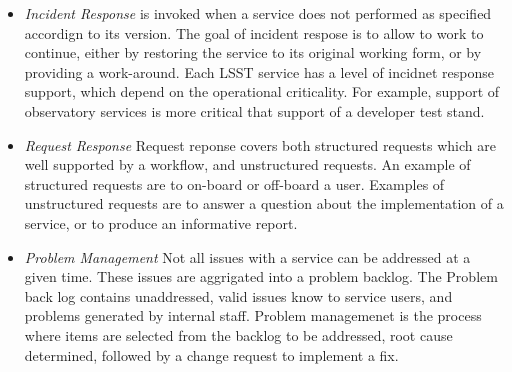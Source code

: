 \begin{enumerate}
\begin{itemize}
  \item \emph{Incident Response} is invoked when a service does not
  performed as specified accordign to its version.  The goal of
  incident respose is to allow to work to continue, either by
  restoring the service to its original working form, or by providing
  a work-around.  Each LSST service has a level of incidnet 
  response support, which depend on the operational criticality.  For
  example, support of observatory services is more critical that support
  of a developer test stand.

  \item \emph{Request Response} Request reponse covers both structured
  requests which are well supported by a workflow, and unstructured
  requests.  An example of structured requests are to on-board or
  off-board a user. Examples of  unstructured requests are to answer a
  question about the implementation of a service, or to produce an
  informative report.
 
  \item \emph{Problem Management} Not all issues with a service can be
  addressed at a given time. These issues are aggrigated into a problem
  backlog. The Problem back log contains unaddressed, valid issues
  know to service users, and problems generated by internal staff.
  Problem managemenet is the process where items are selected from the
  backlog to be addressed, root cause determined, followed by a change
  request to implement a fix.
  
  \end{itemize}
  
\end{enumerate}
